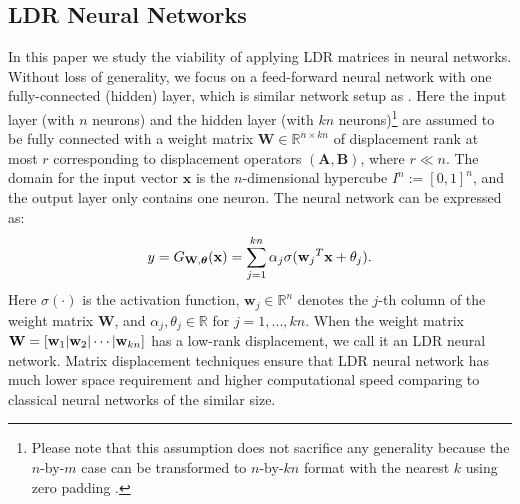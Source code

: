 \documentclass{article}
\begin{document}
\subsection{LDR Neural Networks}
In this paper we study the viability of applying LDR matrices in neural networks. Without loss of generality, we focus on a feed-forward neural network with one fully-connected (hidden) layer, which is similar network setup as \cite{cybenko1989approximation}. Here the input layer (with $n$ neurons) and the hidden layer (with $kn$ neurons)\footnote{Please note that this assumption does not sacrifice any generality because the $n$-by-$m$ case can be transformed to $n$-by-$kn$ format with the nearest $k$ using zero padding \cite{cheng2015exploration}.} are assumed to be fully connected with a weight matrix $\textbf{W}\in\mathbb{R}^{n\times kn}$ of displacement rank at most $r$ corresponding to displacement operators $(\textbf{A},\textbf{B})$, where $r\ll n$. The domain for the input vector $\textbf{x}$ is the $n$-dimensional hypercube $I^n := [0,1]^n$, and the output layer only contains one neuron. The neural network can be expressed as:
\begin{equation}
\label{nn}
y = G_{\textrm{\bf{W}}, \bm{\theta}}(\textrm{\bf{x}}) = \sum_{j=1}^{kn} \alpha_j\sigma({\textrm{\bf{w}}_j}^T\textrm{\bf{x}}+\theta_j).
\end{equation}
Here $\sigma(\cdot)$ is the activation function, $\textbf{w}_j\in\mathbb{R}^n$ denotes the $j$-th column of the weight matrix $\textbf{W}$, and $\alpha_j, \theta_j\in\mathbb{R}$ for $j=1,...,kn$. When the weight matrix $\textbf{W}=[{\bf w}_1|{\bf w}_2|\cdots|{\bf w}_{kn}]$ has a low-rank displacement, we call it an LDR neural network. Matrix displacement techniques ensure that LDR neural network has much lower space requirement and higher computational speed comparing to classical neural networks of the similar size.
\end{document}
